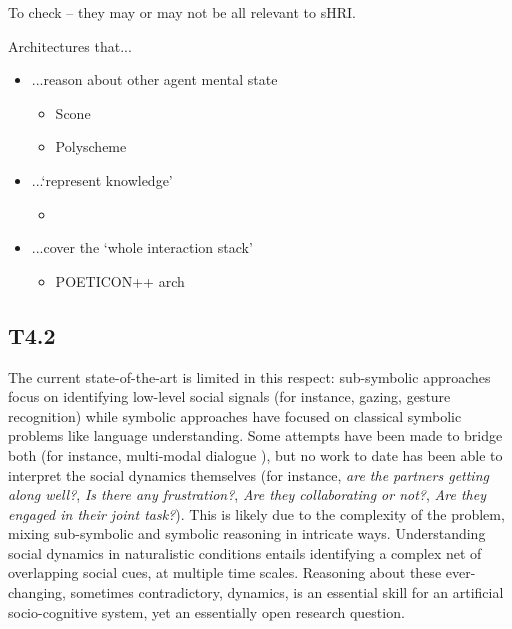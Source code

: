 \documentclass[11pt,a4paper]{report}
\begin{document}
To check -- they may or may not be all relevant to sHRI.

Architectures that...

\begin{itemize}
    \item ...reason about other agent mental state
    \begin{itemize}
        \item Scone~\cite{fahlman2011using}
        \item Polyscheme~\cite{bello2011shared}
    \end{itemize}
    \item ...`represent knowledge'
        \begin{itemize}
            \item \cite{zhang2014towards}
        \end{itemize}
    \item ...cover the `whole interaction stack'
        \begin{itemize}
            \item POETICON++ arch~\cite{antunes2016from} 
        \end{itemize}
\end{itemize}

\subsection{T4.2}

The current state-of-the-art is limited in this respect: sub-symbolic
approaches focus on identifying low-level social signals (for instance,
gazing, gesture recognition) while symbolic approaches have focused on
classical symbolic problems like language understanding. Some attempts
have been made to bridge both (for instance, multi-modal dialogue
\cite{lemaignan2011grounding, lemaignan2017artificial}), but no work to
date has been able to interpret the social dynamics themselves (for
instance, \emph{are the partners getting along well?}, \emph{Is there
any frustration?}, \emph{Are they collaborating or not?}, \emph{Are they
engaged in their joint task?}). This is likely due to the complexity of
the problem, mixing sub-symbolic and symbolic reasoning in intricate
ways. Understanding social dynamics in naturalistic conditions entails
identifying a complex net of overlapping social cues, at multiple time
scales. Reasoning about these ever-changing, sometimes contradictory,
dynamics, is an essential skill for an artificial socio-cognitive
system, yet an essentially open research question.
\end{document}
